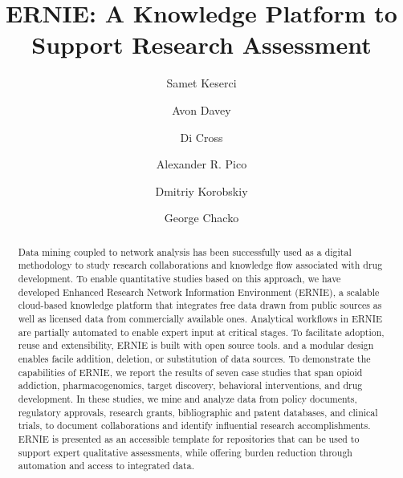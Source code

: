 \documentclass[review]{elsarticle}
\begin{document}
\begin{frontmatter}

\title{ERNIE: A Knowledge Platform to Support Research Assessment}

\author[nl]{Samet Keserci}
\author[nl]{Avon Davey}
\author[ca]{Di Cross}
\author[gi]{Alexander R. Pico}
\author[nl]{Dmitriy Korobskiy}
\author[nl]{George Chacko }



\address[nl]{NETE Labs, NET ESolutions Corporation, McLean, VA, USA}
\address[ca]{Research Data Science \& Evaluation, Clarivate Analytics, USA}
\address[gi]{Gladstone Institutes, San Francisco, CA, USA}

\raggedright

\begin{abstract}

Data mining coupled to network analysis has been successfully used as a digital methodology to study research collaborations and knowledge flow associated with drug development. To enable quantitative studies based on this approach, we have developed Enhanced Research Network Information Environment (ERNIE), a scalable cloud-based knowledge platform that integrates free data drawn from public sources as well as licensed data from commercially available ones. Analytical workflows in ERNIE are partially automated to enable expert input at critical stages. To facilitate adoption, reuse and extensibility, ERNIE is built with open source tools. and a modular design enables facile addition, deletion, or substitution of data sources. To demonstrate the capabilities of ERNIE, we report the results of seven case studies that span opioid addiction, pharmacogenomics, target discovery, behavioral interventions, and drug development. In these studies, we mine and analyze data from policy documents, regulatory approvals, research grants, bibliographic and patent databases, and clinical trials, to document collaborations and identify influential research accomplishments. ERNIE is presented as an accessible template for repositories that can be used to support expert qualitative assessments, while offering burden reduction through automation and access to integrated data.

\end{abstract}


\end{frontmatter}
\end{document}
